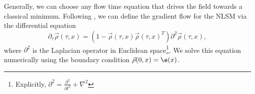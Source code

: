 Generally, we can choose any flow time equation that drives the field towards a classical minimum. Following \cite{bietenholz2018}, we can define the gradient flow for the NLSM via the differential equation
\begin{equation}
    \label{eq:nsm_gradflow}
    \partial_\tau \vec\rho (\tau,x) = \left( 1 - \vec\rho(\tau,x) \vec\rho(\tau,x)^T \right) \partial^2 \vec\rho(\tau,x),
\end{equation}
where $\partial^2$ is the Laplacian operator in Euclidean space\footnote{Explicitly, $\partial^2 = \frac{\partial^2}{\partial t^2} + \nabla^2$}. We solve this equation numerically using the boundary condition $\vec\rho(0,x) = \e(x)$.

